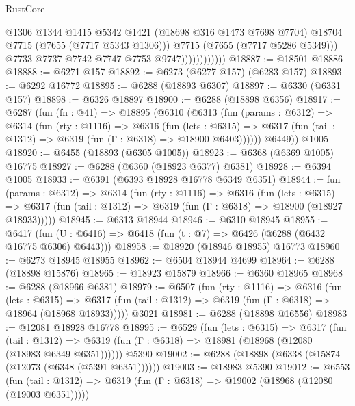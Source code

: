 \begin{lexlean}{RustCore}
\begin{coremodule}
                                @1306
                                @1344
                                @1415
                                @5342
                                @1421
                                (@18698 @316 @1473 @7698 @7704)
                                @18704
                                @7715
                                (@7655 (@7717 @5343 @1306)))
                              @7715
                              (@7655 (@7717 @5286 @5349)))
                            @7733
                            @7737
                            @7742
                            @7747
                            @7753
                            @9747))))))))))))
@18887 := @18501 @18886
@18888 := @6271 @157
@18892 := @6273 (@6277 @157) (@6283 @157)
@18893 := @6292 @16772
@18895 := @6288 (@18893 @6307)
@18897 := @6330 (@6331 @157)
@18898 := @6326 @18897
@18900 := @6288 (@18898 @6356)
@18917 := @6287
    (fun (fn : @41) =>
    @18895
      (@6310
        (@6313
          (fun (params : @6312) =>
          @6314
            (fun (rty : @1116) =>
            @6316
              (fun (lets : @6315) =>
              @6317 (fun (tail : @1312) => @6319 (fun (Γ : @6318) => @18900 @6403))))))
        @6449))
    @1005
@18920 := @6455 (@18893 (@6305 @1005))
@18923 := @6368 (@6369 @1005) @16775
@18927 := @6288 (@6360 (@18923 @6377) @6381)
@18928 := @6394 @1005
@18933 := @6391 (@6393 @18928 @16778 @6349 @6351)
@18944 := fun (params : @6312) =>
  @6314
    (fun (rty : @1116) =>
    @6316
      (fun (lets : @6315) =>
      @6317 (fun (tail : @1312) => @6319 (fun (Γ : @6318) => @18900 (@18927 @18933)))))
@18945 := @6313 @18944
@18946 := @6310 @18945
@18955 := @6417
    (fun (U : @6416) => @6418 (fun (t : @7) => @6426 (@6288 (@6432 @16775 @6306) @6443)))
@18958 := @18920 (@18946 @18955) @16773
@18960 := @6273 @18945 @18955
@18962 := @6504 @18944 @4699
@18964 := @6288 (@18898 @15876)
@18965 := @18923 @15879
@18966 := @6360 @18965
@18968 := @6288 (@18966 @6381)
@18979 := @6507
    (fun (rty : @1116) =>
    @6316
      (fun (lets : @6315) =>
      @6317 (fun (tail : @1312) => @6319 (fun (Γ : @6318) => @18964 (@18968 @18933)))))
    @3021
@18981 := @6288 (@18898 @16556)
@18983 := @12081 @18928 @16778
@18995 := @6529
    (fun (lets : @6315) =>
    @6317
      (fun (tail : @1312) =>
      @6319 (fun (Γ : @6318) => @18981 (@18968 (@12080 (@18983 @6349 @6351))))))
    @5390
@19002 := @6288 (@18898 (@6338 (@15874 (@12073 (@6348 (@5391 @6351))))))
@19003 := @18983 @5390
@19012 := @6553
    (fun (tail : @1312) => @6319 (fun (Γ : @6318) => @19002 (@18968 (@12080 (@19003 @6351)))))

\end{coremodule}
\end{lexlean}
